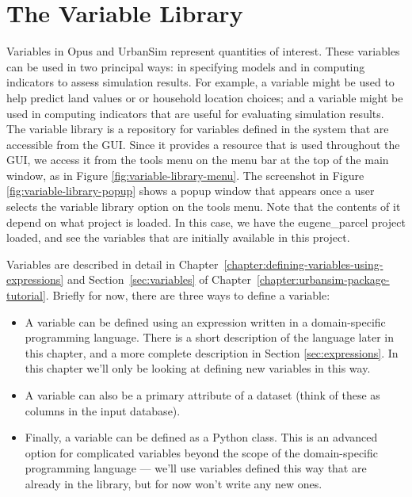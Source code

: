 \chapter{The Variable Library}
\label{chap:variable-library}

Variables in Opus and UrbanSim represent quantities of interest.  These
variables can be used in two principal ways: in specifying models and in
computing indicators to assess simulation results.  For example, a
 variable might be used to help predict land
values or or household location choices; and a 
variable might be used in computing indicators that are useful for
evaluating simulation results.  The variable library is a repository for
variables defined in the system that are accessible from the GUI\@.  Since
it provides a resource that is used throughout the GUI, we access it from
the tools menu on the menu bar at the top of the main window, as in Figure
\ref{fig:variable-library-menu}.  The screenshot in Figure
\ref{fig:variable-library-popup} shows a popup window that appears once a
user selects the variable library option on the tools menu.  Note that the
contents of it depend on what project is loaded.  In this case, we have the
eugene\_parcel project loaded, and see the variables that are initially
available in this project.

Variables are described in detail in 
Chapter~\ref{chapter:defining-variables-using-expressions} and 
Section~\ref{sec:variables} of Chapter~\ref{chapter:urbansim-package-tutorial}.  
Briefly for now, there are three ways to define a variable:

\begin{itemize}

\item A variable can be defined using an expression written in a
  domain-specific programming language.  There is a short description of
  the language later in this chapter, and a more complete description in
  Section \ref{sec:expressions}.  In this chapter we'll only be looking at
  defining new variables in this way.

\item A variable can also be a primary attribute of a dataset (think of
  these as columns in the input database).

\item Finally, a variable can be defined as a Python class.  This is an
  advanced option for complicated variables beyond the scope of the
  domain-specific programming language --- we'll use variables defined this
  way that are already in the library, but for now won't write any new ones.

\end{itemize}

